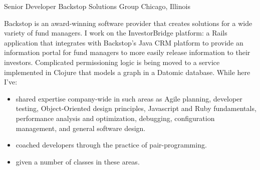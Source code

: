 \documentclass[11pt,letterpaper]{moderncv}
\begin{document}
 {Senior Developer} {Backstop
  Solutions Group} {Chicago, Illinois} {} { Backstop is an
  award-winning software provider that creates solutions for a wide
  variety of fund managers.  I work on the InvestorBridge platform: a
  Rails application that integrates with Backstop's Java CRM platform
  to provide an information portal for fund managers to more easily
  release information to their investors.\newline
  Complicated permissioning logic is being moved to a service
  implemented in Clojure that models a graph in a Datomic
  database.\newline
  While here I've:
\begin{itemize}
  \item shared expertise company-wide in such areas as Agile planning,
    developer testing, Object-Oriented design principles, Javascript
    and Ruby fundamentals, performance analysis and optimization,
    debugging, configuration management, and general software design.
  \item coached developers through the practice of pair-programming.
  \item given a number of classes in these areas.
\end{itemize}
}
\end{document}
